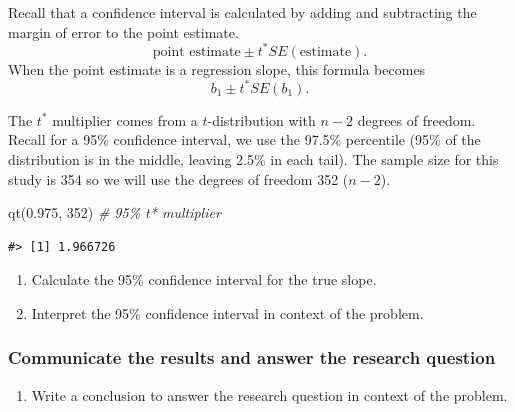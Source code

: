 \documentclass[
]{report}
\newenvironment{Shaded}{\begin{snugshade}}{\end{snugshade}}
\newcommand{\CommentTok}[1]{\textcolor[rgb]{0.56,0.35,0.01}{\textit{#1}}}
\newcommand{\DecValTok}[1]{\textcolor[rgb]{0.00,0.00,0.81}{#1}}
\newcommand{\FloatTok}[1]{\textcolor[rgb]{0.00,0.00,0.81}{#1}}
\newcommand{\FunctionTok}[1]{\textcolor[rgb]{0.00,0.00,0.00}{#1}}
\newcommand{\NormalTok}[1]{#1}
\providecommand{\tightlist}{%
  \setlength{\itemsep}{0pt}\setlength{\parskip}{0pt}}
\begin{document}
Recall that a confidence interval is calculated by adding and subtracting the margin of error to the point estimate.\\
\[\mbox{point estimate}\pm t^*SE(\mbox{estimate}).\]
When the point estimate is a regression slope, this formula becomes
\[b_1 \pm t^* SE(b_1).\]

The \(t^*\) multiplier comes from a \(t\)-distribution with \(n-2\) degrees of freedom. Recall for a 95\% confidence interval, we use the 97.5\% percentile (95\% of the distribution is in the middle, leaving 2.5\% in each tail). The sample size for this study is 354 so we will use the degrees of freedom 352 (\(n-2\)).

\begin{Shaded}
\begin{Highlighting}[]
\FunctionTok{qt}\NormalTok{(}\FloatTok{0.975}\NormalTok{, }\DecValTok{352}\NormalTok{) }\CommentTok{\# 95\% t* multiplier }
\end{Highlighting}
\end{Shaded}

\begin{verbatim}
#> [1] 1.966726
\end{verbatim}

\begin{enumerate}
\def\labelenumi{\arabic{enumi}.}
\setcounter{enumi}{11}
\item
  Calculate the 95\% confidence interval for the true slope.
  \vspace{0.8in}
\item
  Interpret the 95\% confidence interval in context of the problem.
\end{enumerate}

\vspace{.8in}

\hypertarget{communicate-the-results-and-answer-the-research-question-5}{%
\subsubsection*{Communicate the results and answer the research question}\label{communicate-the-results-and-answer-the-research-question-5}}

\begin{enumerate}
\def\labelenumi{\arabic{enumi}.}
\setcounter{enumi}{13}
\tightlist
\item
  Write a conclusion to answer the research question in context of the problem.
\end{enumerate}
\end{document}
